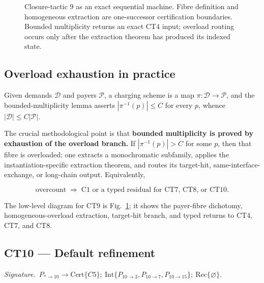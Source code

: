 \documentclass[
  11pt,
]{article}
\theoremstyle{definition}
\newcommand{\ctsignature}[1]{\par\noindent\emph{Signature.}\ #1\par\medskip}
\newcommand{\ctcert}[1]{\mathrm{Cert}\{#1\}}
\newcommand{\ctint}[1]{\mathrm{Int}\{#1\}}
\newcommand{\ctrec}[1]{\mathrm{Rec}\{#1\}}
\newcommand{\ctnone}{\varnothing}
\begin{document}
\begin{figure}[p]
{%
}
\caption[Closure-tactic 9: exact overload machine]{Closure-tactic 9 as an exact sequential machine.  Fibre definition and homogeneous extraction are one-successor certification boundaries.  Bounded multiplicity returns an exact CT4 input; overload routing occurs only after the extraction theorem has produced its indexed state.}
\label{fig:ct9-overload-exhaustion}
\end{figure}
\FloatBarrier


\subsection*{Overload exhaustion in practice}

Given demands \(\mathcal D\) and payers \(\mathcal P\), a charging
scheme is a map \(\pi:\mathcal D\to\mathcal P\), and the
bounded-multiplicity lemma asserts \(|\pi^{-1}(p)|\le C\) for every
\(p\), whence \(|\mathcal D|\le C|\mathcal P|\).

The crucial methodological point is that \textbf{bounded multiplicity is
proved by exhaustion of the overload branch.} If \(|\pi^{-1}(p)| > C\)
for some \(p\), then that fibre is overloaded; one extracts a
monochromatic subfamily, applies the instantiation-specific extraction
theorem, and routes its target-hit, same-interface-exchange, or long-chain
output. Equivalently,

\[
\text{overcount} \;\Rightarrow\;
\text{C1 or a typed residual for CT7, CT8, or CT10}.
\]

The low-level diagram for CT9 is Fig.~\ref{fig:ct9-overload-exhaustion};
it shows the payer-fibre dichotomy, homogeneous-overload extraction,
target-hit branch, and typed returns to CT4, CT7, and CT8.


\subsection{CT10 --- Default refinement}\label{ct:10}\label{the-default-refinement}
\ctsignature{\(P_{\ast\to10}\to \ctcert{C5};\ \ctint{P_{10\to3},P_{10\to7},P_{10\to15}};\ \ctrec{\ctnone}\).}
\end{document}
